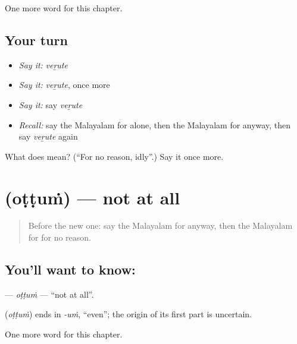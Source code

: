 \begin{grammarlens}[title={What you've built}]
One more word for this chapter.
\end{grammarlens}

\subsection*{Your turn}
\begin{itemize}
\raggedright
  \item \emph{Say it:} \emph{veṟute}
  \item \emph{Say it:} \emph{veṟute}, once more
  \item \emph{Say it:} say \emph{veṟute}
  \item \emph{Recall:} say the Malayalam for alone, then the Malayalam for anyway, then say \emph{veṟute} again
\end{itemize}

\begin{tcolorbox}[breakable,colback=teal!4,colframe=teal!35!black,title={Before you move on}]
What does  mean? (\textquotedblleft{}For no reason, idly\textquotedblright{}.) Say it once more.
\end{tcolorbox}
\section[\texorpdfstring{\ml{ഒട്ടും} (oṭṭuṁ)}{ഒട്ടും (oṭṭuṁ)}]{ (oṭṭuṁ) — not at all}

\label{lesson:ML-C317-ottum}



\begin{quote}
Before the new one: say the Malayalam for anyway, then the Malayalam for for no reason.
\end{quote}

\subsection*{You'll want to know: }
\textbf{} — \emph{oṭṭuṁ} — \textquotedblleft{}not at all\textquotedblright{}.

\begin{cousinweb}
\textbf{} (\emph{oṭṭuṁ}) ends in \emph{-uṁ}, \textquotedblleft{}even\textquotedblright{}; the origin of its first part is uncertain.
\end{cousinweb}

\begin{grammarlens}[title={What you've built}]
One more word for this chapter.
\end{grammarlens}

